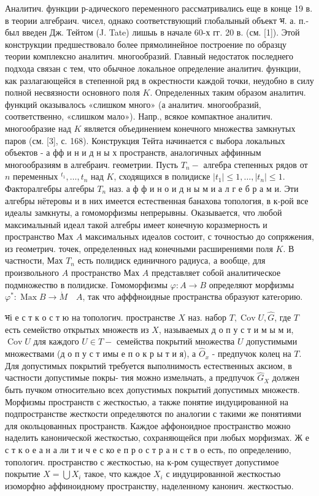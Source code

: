 \documentclass[10pt]{article}
\begin{document}
Аналитич. функции р-адического переменного рассматривались еще в конце 19 в. в теории алгебраич. чисел, однако соответствующий глобалыный объект भ. а. п.- был введен Дж. Тейтом (J. Tate) лишыь в начале 60-х гг. 20 в. (см. [1]). Этой конструкции предшествовало более прямолинейное построение по образцу теории комплексно аналитич. многообразий. Главный недостаток последнего подхода связан с тем, что обычное локальное определение аналитич. функции, как разлагающейся в степенной ряд в окрестности каждой точки, неудобно в силу полной несвязности основного поля $K$. Определенных таким образом аналитич. функций оказывалось «слишком много» (а аналитич. многообразий, соответственно, «слишком мало»). Напр., всякое компактное аналитич. многообразие над $K$ является объединением конечного множества замкнутых паров (см. [3], с. 168). Конструкция Тейта начинается с выбора локальных объектов - а фф и н и д н ы х пространств, аналогичных аффинным многообразиям в алгебраич. геометрии. Пусть $T_{n}-$ алгебра степенных рядов от $n$ переменных ${ }^{t_{1}}, \ldots, t_{n}$ над $K$, сходящихся в полидиске $\left|t_{1}\right| \leqslant 1, \ldots,\left|t_{n}\right| \leqslant 1$. Факторалгебры алгебры $T_{n}$ наз. а ф ф и н о и д н ы м и а л г е б р а м и. Эти алгебры нётеровы и в них имеется естественная банахова топология, в к-рой все идеалы замкнуты, а гомоморфизмы непрерывны. Оказывается, что любой максималыный идеал такой алгебры имеет конечную коразмерность и пространство Мах $A$ максимальных идеалов состоит, с точностью до сопряжения, из геометрич. точек, определенных над конечными расширениями поля $K$. В частности, Мах $T_{n}$ есть полидиск единичного радиуса, а вообще, для произвольного $A$ пространство Мах $A$ представляет собой аналитическое подмножество в полидиске. Гомоморфизмы $\varphi: A \rightarrow B$ определяют морфизмы $\varphi^{*}: \operatorname{Max} B \rightarrow \dot{M} \quad A$, так что афффноидные пространства образуют катеrорию.



भі е с т к о с т ю на топологич. пространстве $X$ наз. набор $T, \operatorname{Cov} U, \widehat{G}$, где $T$ есть семейство открытых множеств из $X$, называемых д о п у с т и м ы м и, $\operatorname{Cov} U$ для каждого $U \in T-$ семейства покрытий множества $U$ допустимыми множествами (д о п у с т имы е п о к р ы т и я), а $\widehat{O}_{x}$ - предпучок колец на $T$. Для допустимых покрытий требуется выполнимость естественных аксиом, в частности допустимые покры- тия можно измельчать, а предпучок $\widehat{G}_{X}$ должен быть пучком относительно всех допустимых покрытий допустимых множеств. Морфизмы пространств с жесткостью, а также понятие индуцированной на подпространстве жесткости определяются по аналогии с такими же понятиями для окольцованных пространств. Каждое аффоноидное пространство можно наделить канонической жесткостью, сохраняющейся при любых морфизмах. Ж е с т к о е а н а ли т и ч е с ко е п р о с т р а н с т в о есть, по определению, топологич. пространство с жесткостью, на к-ром существует допустимое покрытие $X=\bigcup X_{i}$ такое, что каждое $X_{i}$ с индуцированной жесткостью изоморфно аффиноидному пространству, наделенному канонич. жесткостью.
\end{document}
